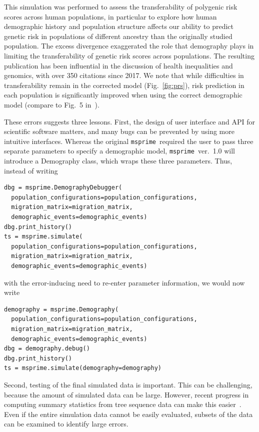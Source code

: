 \documentclass{article}
\newcommand{\msprime}[0]{\texttt{msprime}}
\begin{document}
This simulation was performed to assess the
transferability of polygenic risk scores across human populations, in particular to
explore how human demographic history and population structure affects our ability
to predict genetic risk in populations of different ancestry than the originally studied
population.
The excess divergence exaggerated the role that demography plays
in limiting the transferability of genetic risk scores across populations.
The resulting publication has been influential in the discussion of
health inequalities and genomics, with over 350 citations since 2017.
We note that while difficulties in transferability remain in the corrected model
(Fig.~\ref{fig:prs}), risk prediction in each population is significantly improved
when using the correct demographic model
(compare to Fig.~5 in~\citet{martin2017human}).

These errors suggests three lessons.
First, the design of user interface and API for scientific software matters,
and many bugs can be prevented by using more intuitive interfaces.
Whereas the original \msprime\ required the user to pass
three separate parameters to specify a demographic model, \msprime~ver.~1.0
will introduce a Demography class, which wraps these three parameters.
Thus, instead of writing
\begin{lstlisting}[frame=single]
dbg = msprime.DemographyDebugger(
  population_configurations=population_configurations,
  migration_matrix=migration_matrix,
  demographic_events=demographic_events)
dbg.print_history()
ts = msprime.simulate(
  population_configurations=population_configurations,
  migration_matrix=migration_matrix,
  demographic_events=demographic_events)
\end{lstlisting}
with the error-inducing need to re-enter parameter information,
we would now write
\begin{lstlisting}[frame=single]
demography = msprime.Demography(
  population_configurations=population_configurations,
  migration_matrix=migration_matrix,
  demographic_events=demographic_events)
dbg = demography.debug()
dbg.print_history()
ts = msprime.simulate(demography=demography)
\end{lstlisting}

Second, testing of the final simulated data is important.
This can be challenging, because the amount of simulated data can be large.
However, recent progress in computing summary statistics from tree
sequence data can make this easier~\citep{ralph2020efficiently}.
Even if the entire simulation data cannot be easily evaluated, subsets of the data
can be examined to identify large errors.
\end{document}
